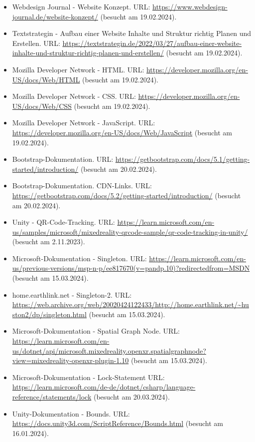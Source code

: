 \begin{itemize}
    \item Webdesign Journal - Website Konzept. URL: \url{https://www.webdesign-journal.de/website-konzept/} (besucht am 19.02.2024).
    \item Textstrategin - Aufbau einer Website Inhalte und Struktur richtig Planen und Erstellen. URL: \url{https://textstrategin.de/2022/03/27/aufbau-einer-website-inhalte-und-struktur-richtig-planen-und-erstellen/} (besucht am 19.02.2024).
    \item Mozilla Developer Network - HTML. URL: \url{https://developer.mozilla.org/en-US/docs/Web/HTML} (besucht am 19.02.2024).
    \item Mozilla Developer Network - CSS. URL: \url{https://developer.mozilla.org/en-US/docs/Web/CSS} (besucht am 19.02.2024).
    \item Mozilla Developer Network - JavaScript. URL: \url{https://developer.mozilla.org/en-US/docs/Web/JavaScript} (besucht am 19.02.2024).
    \item Bootstrap-Dokumentation. URL: \url{https://getbootstrap.com/docs/5.1/getting-started/introduction/} (besucht am 20.02.2024).
    \item Bootstrap-Dokumentation. CDN-Links. URL: \url{https://getbootstrap.com/docs/5.2/getting-started/introduction/} (besucht am 20.02.2024).
    \item Unity - QR-Code-Tracking. URL: \url{https://learn.microsoft.com/en-us/samples/microsoft/mixedreality-qrcode-sample/qr-code-tracking-in-unity/} (besucht am 2.11.2023).
    \item Microsoft-Dokumentation - Singleton. URL: \url{https://learn.microsoft.com/en-us/previous-versions/msp-n-p/ee817670(v=pandp.10)?redirectedfrom=MSDN} (besucht am 15.03.2024).
    \item home.earthlink.net - Singleton-2. URL: \url{https://web.archive.org/web/20020424122433/http://home.earthlink.net/~huston2/dp/singleton.html} (besucht am 15.03.2024).
    \item Microsoft-Dokumentation - Spatial Graph Node. URL: \url{https://learn.microsoft.com/en-us/dotnet/api/microsoft.mixedreality.openxr.spatialgraphnode?view=mixedreality-openxr-plugin-1.10} (besucht am 15.03.2024).
    \item Microsoft-Dokumentation - Lock-Statement URL: \url{https://learn.microsoft.com/de-de/dotnet/csharp/language-reference/statements/lock} (besucht am 20.03.2024).
    \item Unity-Dokumentation - Bounds. URL: \url{https://docs.unity3d.com/ScriptReference/Bounds.html} (besucht am 16.01.2024).

\end{itemize}
